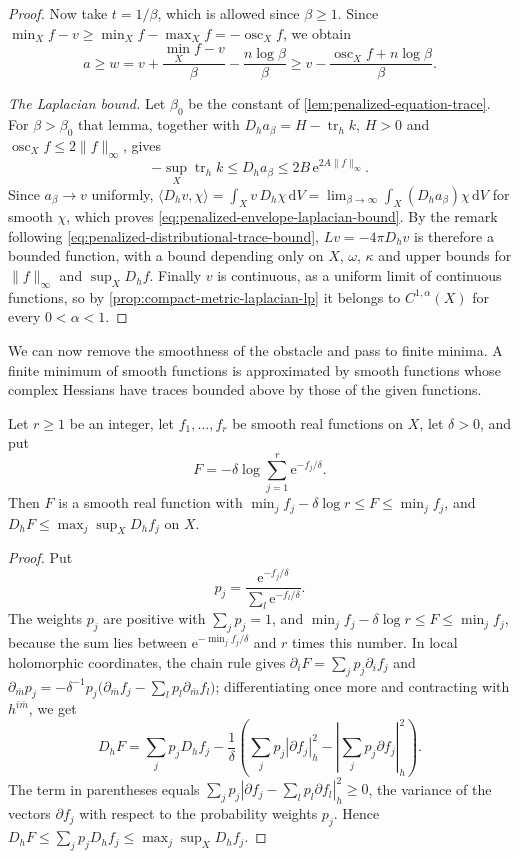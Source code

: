 \begin{proof}
Now take $t=1/\beta$, which is allowed since $\beta\geq1$. Since $\min_Xf-v\geq\min_Xf-\max_Xf=-\operatorname{osc}_Xf$, we obtain
\[
 a\geq w=v+\frac{\min_Xf-v}{\beta}-\frac{n\log\beta}{\beta}
 \geq v-\frac{\operatorname{osc}_Xf+n\log\beta}{\beta}.
\]

\emph{The Laplacian bound.} Let $\beta_0$ be the constant of \cref{lem:penalized-equation-trace}. For $\beta>\beta_0$ that lemma, together with $D_ha_\beta=H-\operatorname{tr}_hk$, $H>0$ and $\operatorname{osc}_Xf\leq2\|f\|_\infty$, gives
\[
 -\sup_X\operatorname{tr}_hk\leq D_ha_\beta\leq2B\,\mathrm e^{2A\|f\|_\infty}.
\]
Since $a_\beta\to v$ uniformly, $\langle D_hv,\chi\rangle=\int_Xv\,D_h\chi\,\mathrm dV=\lim_{\beta\to\infty}\int_X(D_ha_\beta)\chi\,\mathrm dV$ for smooth $\chi$, which proves \eqref{eq:penalized-envelope-laplacian-bound}. By the remark following \eqref{eq:penalized-distributional-trace-bound}, $Lv=-4\pi D_hv$ is therefore a bounded function, with a bound depending only on $X$, $\omega$, $\kappa$ and upper bounds for $\|f\|_\infty$ and $\sup_XD_hf$. Finally $v$ is continuous, as a uniform limit of continuous functions, so by \cref{prop:compact-metric-laplacian-lp} it belongs to $C^{1,\alpha}(X)$ for every $0<\alpha<1$.
\end{proof}

We can now remove the smoothness of the obstacle and pass to finite minima. A finite minimum of smooth functions is approximated by smooth functions whose complex Hessians have traces bounded above by those of the given functions.

\begin{lemma}\label{lem:soft-minimum-trace}
Let $r\geq1$ be an integer, let $f_1,\ldots,f_r$ be smooth real functions on $X$, let $\delta>0$, and put
\[
 F=-\delta\log\sum_{j=1}^r\mathrm e^{-f_j/\delta}.
\]
Then $F$ is a smooth real function with $\min_jf_j-\delta\log r\leq F\leq\min_jf_j$, and $D_hF\leq\max_j\sup_XD_hf_j$ on $X$.
\end{lemma}
\begin{proof}
Put
\[
 p_j=\frac{\mathrm e^{-f_j/\delta}}
                   {\sum_l\mathrm e^{-f_l/\delta}}.
\]
The weights $p_j$ are positive with $\sum_jp_j=1$, and $\min_jf_j-\delta\log r\leq F\leq\min_jf_j$, because the sum lies between $\mathrm e^{-\min_jf_j/\delta}$ and $r$ times this number. In local holomorphic coordinates, the chain rule gives $\partial_iF=\sum_jp_j\partial_if_j$ and $\partial_{\bar m}p_j=-\delta^{-1}p_j\bigl(\partial_{\bar m}f_j-\sum_lp_l\partial_{\bar m}f_l\bigr)$; differentiating once more and contracting with $h^{i\bar m}$, we get
\[
 D_hF
 =\sum_jp_jD_hf_j
 -\frac1\delta\left(\sum_jp_j|\partial f_j|_h^2
                    -\left|\sum_jp_j\partial f_j\right|_h^2\right).
\]
The term in parentheses equals $\sum_jp_j|\partial f_j-\sum_lp_l\partial f_l|_h^2\geq0$, the variance of the vectors $\partial f_j$ with respect to the probability weights $p_j$. Hence $D_hF\leq\sum_jp_jD_hf_j\leq\max_j\sup_XD_hf_j$.
\end{proof}

